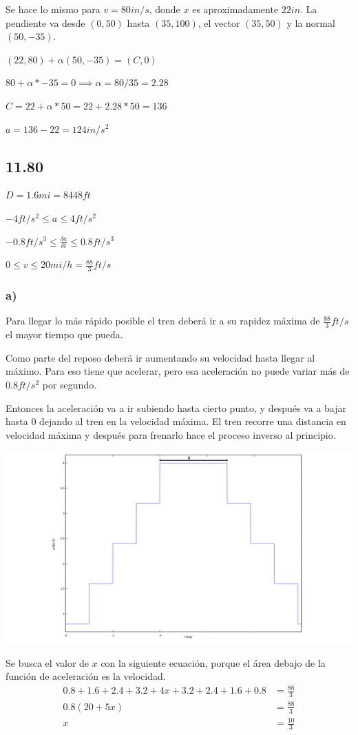 \documentclass[12pt]{article}
\begin{document}
Se hace lo mismo para $v=80in/s$, donde $x$ es aproximadamente $22in$. La pendiente va desde $(0,50)$ hasta $(35,100)$, el vector $(35,50)$ y la normal $(50,-35)$.

$(22,80)+\alpha(50,-35)=(C,0)$

$80+\alpha*-35=0 \implies \alpha=80/35=2.28$

$C=22+\alpha*50=22+2.28*50=136$

$a=136-22=124in/s^2$
\subsection*{11.80}
$D=1.6mi=8448ft$

$-4ft/s^2\le a\le 4ft/s^2$

$-0.8ft/s^3\le \frac{\delta a}{\delta t}\le 0.8ft/s^3$

$0\le v\le 20mi/h=\frac{88}{3}ft/s$
\subsubsection*{a)}
Para llegar lo más rápido posible el tren deberá ir a su rapidez máxima de $\frac{88}{3}ft/s$ el mayor tiempo que pueda.

Como parte del reposo deberá ir aumentando su velocidad hasta llegar al máximo. Para eso tiene que acelerar, pero esa aceleración no puede variar más de $0.8ft/s^2$ por segundo.

Entonces la aceleración va a ir subiendo hasta cierto punto, y después va a bajar hasta 0 dejando al tren en la velocidad máxima. El tren recorre una distancia en velocidad máxima y después para frenarlo hace el proceso inverso al principio.

\includegraphics[width=\linewidth]{1180a}

Se busca el valor de $x$ con la siguiente ecuación, porque el área debajo de la función de aceleración es la velocidad.
\begin{align*}
  0.8+1.6+2.4+3.2+4x+3.2+2.4+1.6+0.8&=\frac{88}{3}\\
  0.8(20+5x)&=\frac{88}{3}\\
  x&=\frac{10}{3}
\end{align*}
\end{document}
